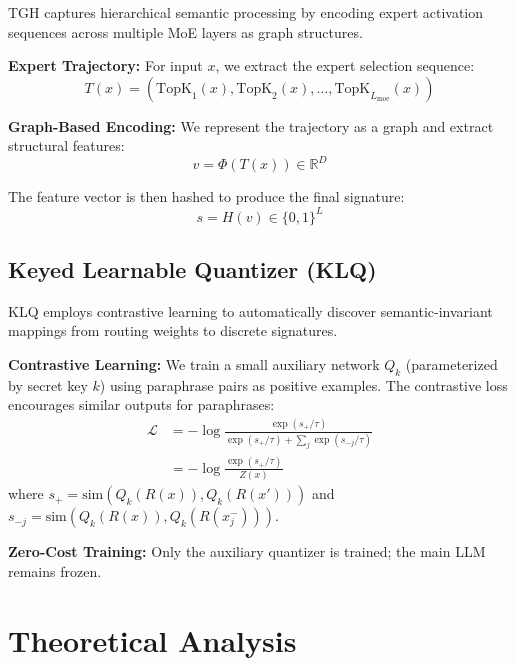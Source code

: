 \documentclass[letterpaper,twocolumn,10pt]{article}
\begin{document}
TGH captures hierarchical semantic processing by encoding expert activation sequences across multiple MoE layers as graph structures.

\textbf{Expert Trajectory:} For input $x$, we extract the expert selection sequence:
\begin{equation}
T(x) = (\text{TopK}_1(x), \text{TopK}_2(x), \ldots, \text{TopK}_{L_{\text{moe}}}(x))
\end{equation}

\textbf{Graph-Based Encoding:} We represent the trajectory as a graph and extract structural features:
\begin{equation}
v = \Phi(T(x)) \in \mathbb{R}^D
\end{equation}

The feature vector is then hashed to produce the final signature:
\begin{equation}
s = H(v) \in \{0,1\}^L
\end{equation}

\subsection{Keyed Learnable Quantizer (KLQ)}

KLQ employs contrastive learning to automatically discover semantic-invariant mappings from routing weights to discrete signatures.

\textbf{Contrastive Learning:} We train a small auxiliary network $Q_k$ (parameterized by secret key $k$) using paraphrase pairs as positive examples. The contrastive loss encourages similar outputs for paraphrases:
\begin{align}
\mathcal{L} &= -\log \frac{\exp(s_{+}/\tau)}{\exp(s_{+}/\tau) + \sum_j \exp(s_{-j}/\tau)} \nonumber \\
&= -\log \frac{\exp(s_{+}/\tau)}{Z(x)} \label{eq:contrastive_loss}
\end{align}
where $s_{+} = \text{sim}(Q_k(R(x)), Q_k(R(x')))$ and $s_{-j} = \text{sim}(Q_k(R(x)), Q_k(R(x_j^-)))$.

\textbf{Zero-Cost Training:} Only the auxiliary quantizer is trained; the main LLM remains frozen.

\section{Theoretical Analysis}
\end{document}
